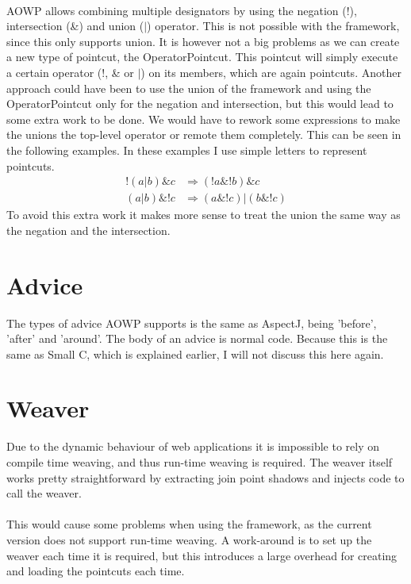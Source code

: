 \documentclass[a4paper]{report}
\begin{document}
\\
AOWP allows combining multiple designators by using the negation (!), intersection (\&) and union ($|$) operator. This is not possible with the framework, since this only supports union. It is however not a big problems as we can create a new type of pointcut, the OperatorPointcut. This pointcut will simply execute a certain operator (!, \& or $|$) on its members, which are again pointcuts. Another approach could have been to use the union of the framework and using the OperatorPointcut only for the negation and intersection, but this would lead to some extra work to be done. We would have to rework some expressions to make the unions the top-level operator or remote them completely. This can be seen in the following examples. In these examples I use simple letters to represent pointcuts.\\
\begin{align*}
!\left(a | b\right) \& c & \Rightarrow \left(!a \& !b\right) \& c\\
\left(a | b \right) \& !c & \Rightarrow \left(a \& !c\right) | \left(b \& !c \right)
\end{align*}
To avoid this extra work it makes more sense to treat the union the same way as the negation and the intersection.

\section{Advice}
The types of advice AOWP supports is the same as AspectJ, being 'before', 'after' and 'around'. The body of an advice is normal code. Because this is the same as Small C, which is explained earlier, I will not discuss this here again.

\section{Weaver}
Due to the dynamic behaviour of web applications it is impossible to rely on compile time weaving, and thus run-time weaving is required. The weaver itself works pretty straightforward by extracting join point shadows and injects code to call the weaver.\\
\\
This would cause some problems when using the framework, as the current version does not support run-time weaving. A work-around is to set up the weaver each time it is required, but this introduces a large overhead for creating and loading the pointcuts each time.
\end{document}
